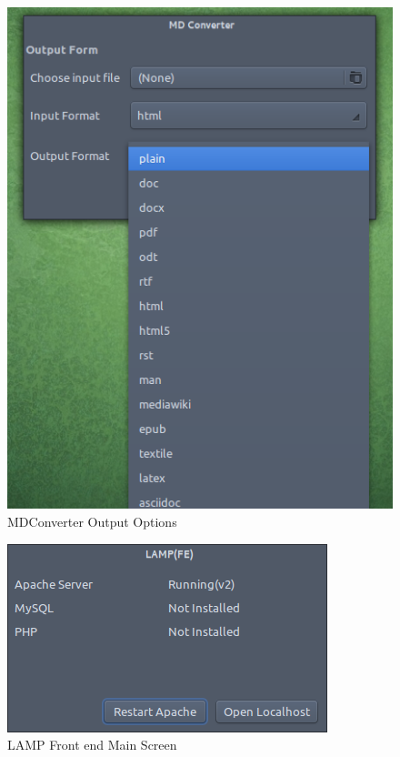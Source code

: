 \begin{figure}[h]
\begin{center}
  \includegraphics[scale=0.89] {26.png}
  \caption[Screenshot - MDConverter Output Options]{MDConverter Output Options}
\end{center}
\end{figure}
\newpage
\begin{figure}[h]
\begin{center}
  \includegraphics[scale=0.89] {27.png}
  \caption[Screenshot - LAMP Front End]{LAMP Front end Main Screen}
\end{center}
\end{figure}
